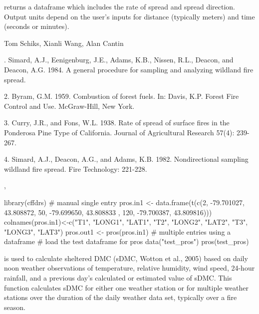 \documentclass[a4paper]{book}
\begin{document}
%
\begin{Value}
 returns a dataframe which includes the rate of spread
and spread direction. Output units depend on the user’s inputs for
distance (typically meters) and time (seconds or minutes).
\end{Value}
%
\begin{Author}\relax
Tom Schiks, Xianli Wang, Alan Cantin
\end{Author}
%
\begin{References}. Simard, A.J., Eenigenburg, J.E., Adams, K.B., Nissen, R.L.,
Deacon, and Deacon, A.G. 1984. A general procedure for sampling and
analyzing wildland fire spread.

2. Byram, G.M. 1959. Combustion of forest fuels. In: Davis, K.P. Forest Fire
Control and Use. McGraw-Hill, New York.

3. Curry, J.R., and Fons, W.L. 1938. Rate of spread of surface fires in the
Ponderosa Pine Type of California. Journal of Agricultural Research 57(4):
239-267.

4. Simard, A.J., Deacon, A.G., and Adams, K.B. 1982. Nondirectional sampling
wildland fire spread. Fire Technology: 221-228.
\end{References}
%
\begin{SeeAlso}\relax
{},
\end{SeeAlso}
%
\begin{Examples}
\begin{ExampleCode}

library(cffdrs)
# manual single entry
pros.in1 <- data.frame(t(c(2, -79.701027, 43.808872, 50, -79.699650, 43.808833
                            , 120, -79.700387, 43.809816)))
colnames(pros.in1)<-c("T1", "LONG1", "LAT1", "T2", "LONG2", "LAT2", "T3", 
                      "LONG3", "LAT3")
pros.out1 <- pros(pros.in1)
# multiple entries using a dataframe
# load the test dataframe for pros
data("test_pros")
pros(test_pros)

\end{ExampleCode}
\end{Examples}
%
\begin{Description}\relax
{} is used to calculate sheltered DMC (sDMC, Wotton et al., 2005)
based on daily noon weather observations of temperature, relative humidity,
wind speed, 24-hour rainfall, and a previous day's calculated or estimated
value of sDMC. This function calculates sDMC for either one weather station
or for multiple weather stations over the duration of the daily weather data
set, typically over a fire season.
\end{Description}
\end{document}
